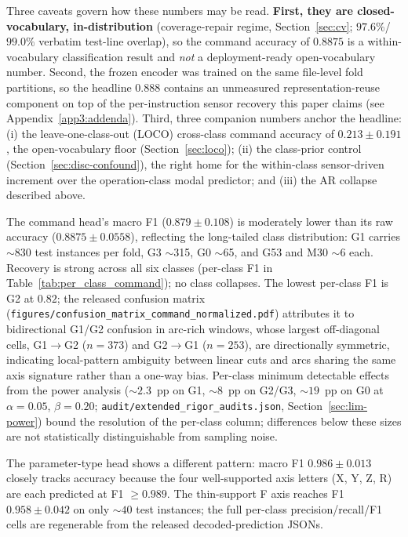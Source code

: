 \documentclass[sensors,article,submit,moreauthors,pdftex]{Definitions/mdpi}
\begin{document}
Three caveats govern how these numbers may be read. \textbf{First, they are closed-vocabulary, in-distribution} (coverage-repair regime, Section~\ref{sec:cv}; $97.6\%$/$99.0\%$ verbatim test-line overlap), so the command accuracy of $0.8875$ is a within-vocabulary classification result and \emph{not} a deployment-ready open-vocabulary number. Second, the frozen encoder was trained on the same file-level fold partitions, so the headline $0.888$ contains an unmeasured representation-reuse component on top of the per-instruction sensor recovery this paper claims (see Appendix~\ref{app3:addenda}). Third, three companion numbers anchor the headline: (i) the leave-one-class-out (LOCO) cross-class command accuracy of $0.213 \pm 0.191$, the open-vocabulary floor (Section~\ref{sec:loco}); (ii) the class-prior control (Section~\ref{sec:disc-confound}), the right home for the within-class sensor-driven increment over the operation-class modal predictor; and (iii) the AR collapse described above.




The command head's macro F1 ($0.879 \pm 0.108$) is moderately lower than its raw accuracy ($0.8875 \pm 0.0558$), reflecting the long-tailed class distribution: G1 carries $\sim$830 test instances per fold, G3 $\sim$315, G0 $\sim$65, and G53 and M30 $\sim$6 each. Recovery is strong across all six classes (per-class F1 in Table~\ref{tab:per_class_command}); no class collapses. The lowest per-class F1 is G2 at $0.82$; the released confusion matrix (\texttt{figures/confusion\_matrix\_command\_normalized.pdf}) attributes it to bidirectional G1/G2 confusion in arc-rich windows, whose largest off-diagonal cells, G1$\to$G2 ($n\!=\!373$) and G2$\to$G1 ($n\!=\!253$), are directionally symmetric, indicating local-pattern ambiguity between linear cuts and arcs sharing the same axis signature rather than a one-way bias. Per-class minimum detectable effects from the power analysis ($\sim$$2.3$~pp on G1, $\sim$$8$~pp on G2/G3, $\sim$$19$~pp on G0 at $\alpha\!=\!0.05$, $\beta\!=\!0.20$; \texttt{audit/extended\_rigor\_audits.json}, Section~\ref{sec:lim-power}) bound the resolution of the per-class column; differences below these sizes are not statistically distinguishable from sampling noise.



The parameter-type head shows a different pattern: macro F1 $0.986 \pm 0.013$ closely tracks accuracy because the four well-supported axis letters (X, Y, Z, R) are each predicted at F1 $\ge\!0.989$. The thin-support F axis reaches F1 $0.958 \pm 0.042$ on only $\sim$$40$ test instances; the full per-class precision/recall/F1 cells are regenerable from the released decoded-prediction JSONs.
\end{document}
